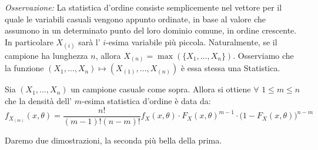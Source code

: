 \textit{Osservazione:} La statistica d'ordine consiste semplicemente nel vettore per il quale le variabili casuali vengono appunto ordinate, in base al valore che assumono in un determinato punto del loro dominio comune, in ordine crescente. In particolare $X_{(i)}$ sarà l' $i$-esima variabile più piccola. Naturalmente, se il campione ha lunghezza $n$, allora $X_{(n)}=\max\left(\{X_1,\ldots,X_n\}\right)$. 
Osserviamo che la funzione $\left(X_1,\ldots,X_n\right)\longmapsto \left(X_{(1)},\ldots,X_{(n)}\right)$ è essa stessa una Statistica.
\begin{teo}\label{dist:ordine}
Sia $\left(X_1,\ldots,X_n\right)$ un campione casuale come sopra. Allora si ottiene $\forall$ $1\leq m\leq n$ che la densità dell' $m$-esima statistica d'ordine è data da: 
\begin{displaymath}
f_{X_{(m)}}\left(x,\theta\right)=\frac{n!}{(m-1)!(n-m)!}f_X\left(x,\theta\right)\cdot F_X\left(x,\theta\right)^{m-1}\cdot \big(1-F_X\left(x,\theta\right)\big)^{n-m}
\end{displaymath}
\end{teo}
Daremo due dimostrazioni, la seconda più bella della prima.
